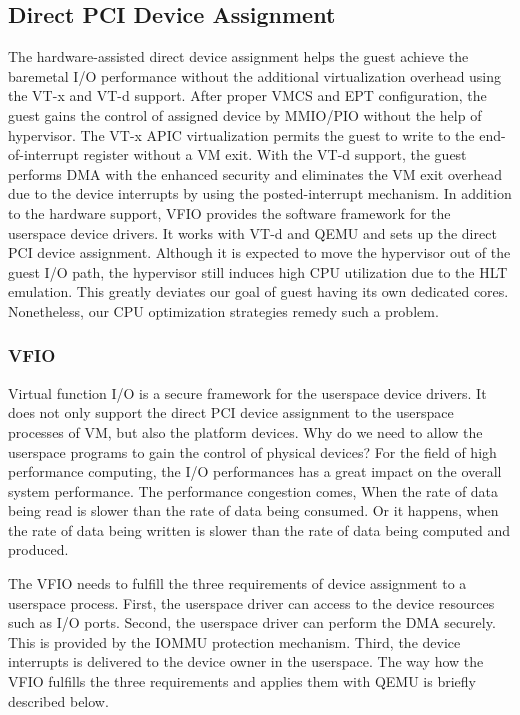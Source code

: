 \subsection{Direct PCI Device Assignment}
The hardware-assisted direct device assignment helps the guest
achieve the baremetal I/O performance without the additional
virtualization overhead using the VT-x and VT-d support.
After proper VMCS and EPT configuration, the guest gains
the control of assigned device
by MMIO/PIO without the help of hypervisor. The VT-x APIC
virtualization permits the guest to write to the
end-of-interrupt register without a VM exit. With the VT-d
support, the guest performs DMA with the enhanced security and
eliminates the VM exit overhead due to the device interrupts by using 
the posted-interrupt mechanism. In addition to the hardware
support, VFIO provides the software framework for the
userspace device drivers. It works with VT-d and QEMU and sets
up the direct PCI device assignment. Although it is expected
to move the hypervisor out of the guest I/O path, the
hypervisor still induces high CPU utilization due to the
HLT emulation. This greatly deviates our goal of guest having
its own dedicated cores. Nonetheless, our CPU optimization
strategies remedy such a problem.

\subsubsection{VFIO}
Virtual function I/O is a secure framework for the userspace
device drivers. It does not only support the direct PCI device
assignment to the userspace processes of VM, but also the
platform devices. Why do we need to allow the userspace
programs to gain the control of physical devices? For the
field of high performance computing, the I/O performances has
a great impact on the overall system performance. The
performance congestion comes, When the rate of data being read
is slower than the rate of data being consumed. Or it happens,
when the rate of data being written is slower than the rate of
data being computed and produced.

The VFIO needs to fulfill the three requirements of device
assignment to a userspace process. First, the userspace driver
can access to the device resources such as I/O ports. Second,
the userspace driver can perform the DMA securely. This is
provided by the IOMMU protection mechanism. Third, the device
interrupts is delivered to the device owner in the userspace.
The way how the VFIO fulfills the three requirements and
applies them with QEMU is briefly described below.


